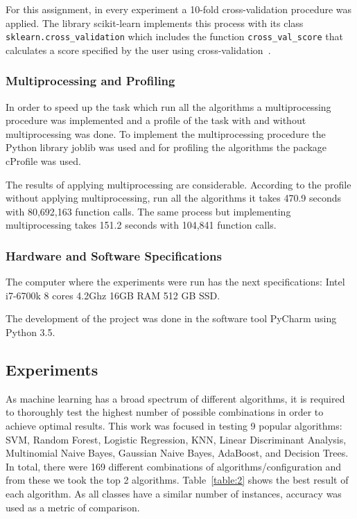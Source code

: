 \documentclass[letterpaper,10pt]{article}
\theoremstyle{mytheor}
\begin{document}
For this assignment, in every experiment a 10-fold cross-validation procedure was applied. The library scikit-learn implements this process with its class \lstinline|sklearn.cross_validation| which includes the function \lstinline|cross_val_score| that calculates a score specified by the user using cross-validation~\cite{scikit-learn}.


\subsubsection{Multiprocessing and Profiling}
In order to speed up the task which run all the algorithms a multiprocessing procedure was implemented and a profile of the task with and without multiprocessing was done. To implement the multiprocessing procedure the Python library joblib was used and for profiling the algorithms the package cProfile was used.

The results of applying multiprocessing are considerable. According to the profile without applying multiprocessing, run all the algorithms it takes 470.9 seconds with 80,692,163 function calls. The same process but implementing multiprocessing takes 151.2 seconds with 104,841 function calls. 

\subsubsection{Hardware and Software Specifications}

The computer where the experiments were run has the next specifications: Intel i7-6700k 8 cores 4.2Ghz 16GB RAM 512 GB SSD.

The development of the project was done in the software tool PyCharm using Python 3.5.

\subsection{Experiments}
As machine learning has a broad spectrum of different algorithms, it is required to thoroughly test  the highest number of possible combinations in order to achieve optimal results. This work was focused in testing 9 popular algorithms: SVM, Random Forest, Logistic Regression, KNN, Linear Discriminant Analysis, Multinomial Naive Bayes, Gaussian Naive Bayes, AdaBoost, and Decision Trees. In total, there were 169 different combinations of algorithms/configuration and from these we took the top 2 algorithms. Table~\ref{table:2} shows the best result of each algorithm. As all classes have a similar number of instances, accuracy was used as a metric of comparison. 
\end{document}
